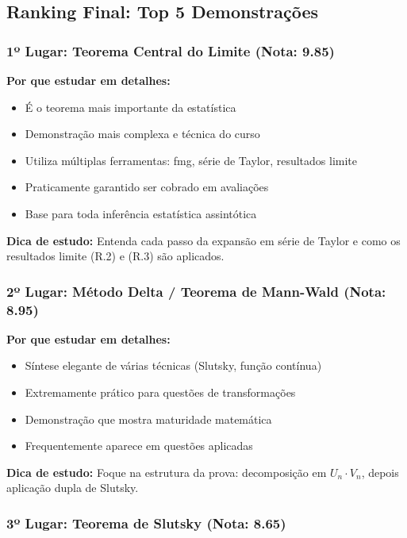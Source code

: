 \documentclass[12pt,a4paper]{article}
\theoremstyle{plain}
\theoremstyle{definition}
\theoremstyle{remark}
\begin{document}
\subsection{Ranking Final: Top 5 Demonstrações}

\subsubsection{1º Lugar: Teorema Central do Limite (Nota: 9.85)}

\textbf{Por que estudar em detalhes:}
\begin{itemize}
    \item É o teorema mais importante da estatística
    \item Demonstração mais complexa e técnica do curso
    \item Utiliza múltiplas ferramentas: fmg, série de Taylor, resultados limite
    \item Praticamente garantido ser cobrado em avaliações
    \item Base para toda inferência estatística assintótica
\end{itemize}

\textbf{Dica de estudo:} Entenda cada passo da expansão em série de Taylor e como os resultados limite (R.2) e (R.3) são aplicados.

\subsubsection{2º Lugar: Método Delta / Teorema de Mann-Wald (Nota: 8.95)}

\textbf{Por que estudar em detalhes:}
\begin{itemize}
    \item Síntese elegante de várias técnicas (Slutsky, função contínua)
    \item Extremamente prático para questões de transformações
    \item Demonstração que mostra maturidade matemática
    \item Frequentemente aparece em questões aplicadas
\end{itemize}

\textbf{Dica de estudo:} Foque na estrutura da prova: decomposição em $U_n \cdot V_n$, depois aplicação dupla de Slutsky.

\subsubsection{3º Lugar: Teorema de Slutsky (Nota: 8.65)}
\end{document}
